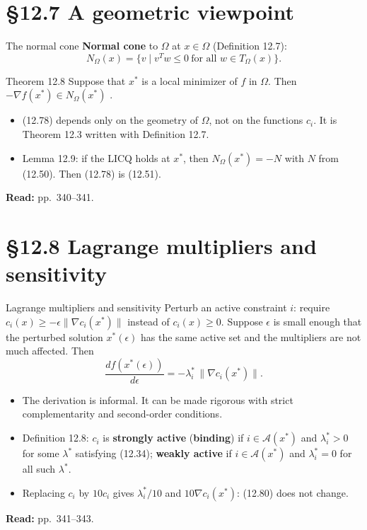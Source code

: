 \documentclass[aspectratio=169,12pt]{beamer}
\newcommand{\xs}{x^{*}}
\newcommand{\gradf}{\nabla f}
\newcommand{\eqn}[1]{\text{\small(#1)}}
\newcommand{\readbook}[1]{{\color{red}\textbf{Read:} #1}}
\newcommand{\ls}{\lambda^{*}}
\newcommand{\cA}{\mathcal{A}}
\newcommand{\TO}{T_{\Omega}}
\newcommand{\NO}{N_{\Omega}}
\begin{document}
\section{\S12.7 A geometric viewpoint}

\begin{frame}{The normal cone}
  \textbf{Normal cone} to $\Omega$ at $x\in\Omega$ (Definition 12.7):
  \[ \NO(x)=\{v\mid v^{T}w\le 0\ \text{for all } w\in\TO(x)\} . \tag{12.77} \]
  \begin{block}{Theorem 12.8}
    Suppose that $\xs$ is a local minimizer of $f$ in $\Omega$. Then\ \
    $-\gradf(\xs)\in\NO(\xs)$ \eqn{12.78}.
  \end{block}
  \begin{itemize}\setlength\itemsep{0.3em}
    \item (12.78) depends only on the geometry of $\Omega$, not on the functions $c_{i}$.
      It is Theorem 12.3 written with Definition 12.7.
    \item Lemma 12.9: if the LICQ holds at $\xs$, then $\NO(\xs)=-N$ with $N$ from (12.50).
      Then (12.78) is (12.51).
  \end{itemize}
  \readbook{pp.~340--341.}
\end{frame}

\section{\S12.8 Lagrange multipliers and sensitivity}

\begin{frame}{Lagrange multipliers and sensitivity}
  Perturb an active constraint $i$: require $c_{i}(x)\ge-\epsilon\|\nabla c_{i}(\xs)\|$ instead of
  $c_{i}(x)\ge 0$. Suppose $\epsilon$ is small enough that the perturbed solution $\xs(\epsilon)$ has
  the same active set and the multipliers are not much affected. Then
  \[ \frac{d f(\xs(\epsilon))}{d\epsilon}=-\ls_{i}\,\|\nabla c_{i}(\xs)\| . \tag{12.80} \]
  \begin{itemize}\setlength\itemsep{0.25em}
    \item The derivation is informal. It can be made rigorous with strict complementarity and
      second-order conditions.
    \item Definition 12.8: $c_{i}$ is \textbf{strongly active} (\textbf{binding}) if $i\in\cA(\xs)$ and
      $\ls_{i}>0$ for some $\ls$ satisfying (12.34); \textbf{weakly active} if $i\in\cA(\xs)$ and
      $\ls_{i}=0$ for all such $\ls$.
    \item Replacing $c_{i}$ by $10c_{i}$ gives $\ls_{i}/10$ and $10\nabla c_{i}(\xs)$:
      (12.80) does not change.
  \end{itemize}
  \readbook{pp.~341--343.}
\end{frame}
\end{document}
